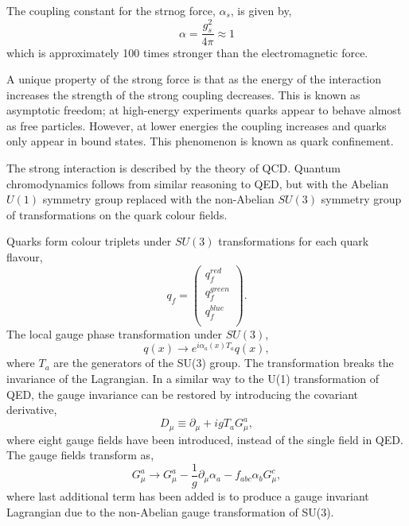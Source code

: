 The coupling constant for the strnog force, $\alpha_s$, is given by,
\begin{equation}
\alpha = \frac{g_s^2}{4 \pi} \approx 1
\end{equation}
which is approximately 100 times stronger than the {electromagnetic} force.

A unique property of the strong force is that as the energy of the interaction
increases the strength of the strong coupling decreases. This is known as
asymptotic freedom; at high-energy experiments quarks appear to behave almost as
free particles. However, at lower energies the coupling increases and quarks
only appear in bound states. This phenomenon is known as quark confinement.  

The strong interaction is described by the theory of {QCD}.
Quantum chromodynamics follows from similar reasoning to {QED}, but with
the Abelian $U(1)$ symmetry group replaced with the non-Abelian $SU(3)$ symmetry
group of transformations on the quark colour fields.

Quarks form colour triplets under $SU(3)$ transformations for each quark
flavour,
\begin{equation}
q_{f} =
\left(\begin{matrix} 
q^{red}_{f} \\
q^{green}_{f} \\
q^{blue}_{f} \\
\end{matrix} \right).
\end{equation}
The local gauge phase transformation under $SU(3)$,
\begin{equation}
q(x) \to e^{i\alpha_a(x)T_a} q(x),
\end{equation}
where $T_a$ are the generators of the SU(3) group. The transformation breaks
the invariance of the Lagrangian. In a similar way to the U(1) transformation of
QED, the gauge invariance can be restored by introducing the covariant
derivative,
\begin{equation}
D_{\mu} \equiv \partial_{\mu} + i g T_{a} G_{\mu}^{a},
\end{equation}
where eight gauge fields have been introduced, instead of the single field in
QED.  The gauge fields transform as,
\begin{equation}
 G_{\mu}^{a} \to G_{\mu}^{a} 
-\frac{1}{g}\partial_{\mu}\alpha_{a}
-f_{abc}\alpha_{b}G^{c}_{\mu},
\end{equation}
where last additional term has been added is to produce a gauge invariant
Lagrangian due to the non-Abelian gauge transformation of SU(3).

